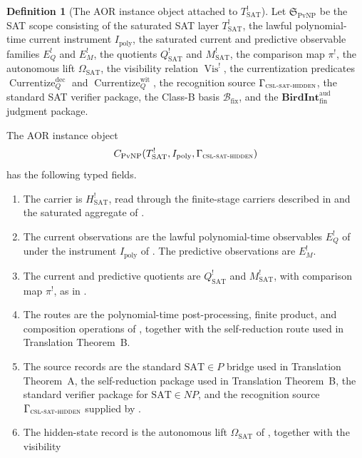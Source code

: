 \documentclass[11pt]{article}
\newcommand{\Tsat}{T^{!}_{\mathrm{SAT}}}
\newcommand{\Hsat}{H^{!}_{\mathrm{SAT}}}
\newcommand{\Ipoly}{I_{\mathrm{poly}}}
\newcommand{\EQbang}{E^{!}_{Q}}
\newcommand{\EMbang}{E^{!}_{M}}
\newcommand{\Qsat}{Q^{!}_{\mathrm{SAT}}}
\newcommand{\Msat}{M^{!}_{\mathrm{SAT}}}
\newcommand{\ComparisonMap}{\pi^{!}}
\newcommand{\OmegaSAT}{\Omega_{\mathrm{SAT}}}
\newcommand{\VisBang}{\operatorname{Vis}^{!}}
\newcommand{\CurrentizeDec}{\operatorname{Currentize}^{\mathrm{dec}}_{Q}}
\newcommand{\CurrentizeWit}{\operatorname{Currentize}^{\mathrm{wit}}_{Q}}
\newcommand{\CSLSATHidden}{\Gamma_{\textsc{csl-sat-hidden}}}
\newcommand{\BirdInt}{\mathbf{BirdInt}^{\mathrm{aud}}_{\mathrm{fin}}}
\theoremstyle{definition}
\newtheorem{definition}[theorem]{Definition}
\begin{document}
\begin{definition}[The AOR instance object attached to \(\Tsat\)]
\label{def:pvnp:aor-instance:object}
Let \(\mathfrak S_{\mathrm{PvNP}}\) be the SAT scope consisting of the
saturated SAT layer \(\Tsat\), the lawful polynomial-time current
instrument \(\Ipoly\), the saturated current and predictive observable
families \(\EQbang\) and \(\EMbang\), the quotients \(\Qsat\) and
\(\Msat\), the comparison map \(\ComparisonMap\), the autonomous lift
\(\OmegaSAT\), the visibility relation \(\VisBang\), the
currentization predicates \(\CurrentizeDec\) and \(\CurrentizeWit\),
the recognition source \(\CSLSATHidden\), the standard SAT verifier
package, the Class-B basis \(\mathcal B_{\mathrm{fix}}\), and the
\(\BirdInt\) judgment package.

The AOR instance object
\[
  C_{\mathrm{PvNP}}(\Tsat,\Ipoly,\CSLSATHidden)
\]
has the following typed fields.
\begin{enumerate}
  \item The carrier is \(\Hsat\), read through the finite-stage
        carriers described in  and the
        saturated aggregate of .
  \item The current observations are the lawful polynomial-time
        observables \(\EQbang\) of 
        under the instrument \(\Ipoly\) of .
        The predictive observations are \(\EMbang\).
  \item The current and predictive quotients are \(\Qsat\) and
        \(\Msat\), with comparison map \(\ComparisonMap\), as in
        .
  \item The routes are the polynomial-time post-processing, finite
        product, and composition operations of
        , together with the
        self-reduction route used in Translation Theorem~B.
  \item The source records are the standard \(\mathrm{SAT}\in P\)
        bridge used in Translation Theorem~A, the self-reduction
        package used in Translation Theorem~B, the standard verifier
        package for \(\mathrm{SAT}\in NP\), and the recognition source
        \(\CSLSATHidden\) supplied by \citet{TsiokosHiddenness2026}.
  \item The hidden-state record is the autonomous lift \(\OmegaSAT\)
        of , together with the visibility

\end{enumerate}
\end{definition}
\end{document}
